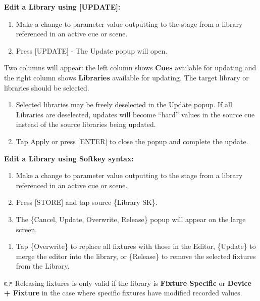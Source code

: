\documentclass[
]{article}
\providecommand{\tightlist}{%
  \setlength{\itemsep}{0pt}\setlength{\parskip}{0pt}}
\begin{document}
\textbf{Edit a Library using {[}UPDATE{]}:}

\begin{enumerate}
\def\labelenumi{\arabic{enumi}.}
\item
  Make a change to parameter value outputting to the stage from a library referenced in an active cue or scene.
\item
  Press {[}UPDATE{]} - The Update popup will open.
\end{enumerate}

Two columns will appear: the left column shows \textbf{Cues} available for updating and the right column shows \textbf{Libraries} available for updating. The target library or libraries should be selected.

\begin{enumerate}
\def\labelenumi{\arabic{enumi}.}
\setcounter{enumi}{2}
\item
  Selected libraries may be freely deselected in the Update popup. If all Libraries are deselected, updates will become ``hard'' values in the source cue instead of the source libraries being updated.
\item
  Tap Apply or press {[}ENTER{]} to close the popup and complete the update.
\end{enumerate}

\textbf{Edit a Library using Softkey syntax:}

\begin{enumerate}
\def\labelenumi{\arabic{enumi}.}
\item
  Make a change to parameter value outputting to the stage from a library referenced in an active cue or scene.
\item
  Press {[}STORE{]} and tap source \{Library SK\}.
\item
  The \{Cancel, Update, Overwrite, Release\} popup will appear on the large screen.
\end{enumerate}

\begin{enumerate}
\def\labelenumi{\arabic{enumi}.}
\setcounter{enumi}{3}
\tightlist
\item
  Tap \{Overwrite\} to replace all fixtures with those in the Editor, \{Update\} to merge the editor into the library, or \{Release\} to remove the selected fixtures from the Library.
\end{enumerate}

👉 Releasing fixtures is only valid if the library is \textbf{Fixture Specific} or \textbf{Device + Fixture} in the case where specific fixtures have modified recorded values.
\end{document}

